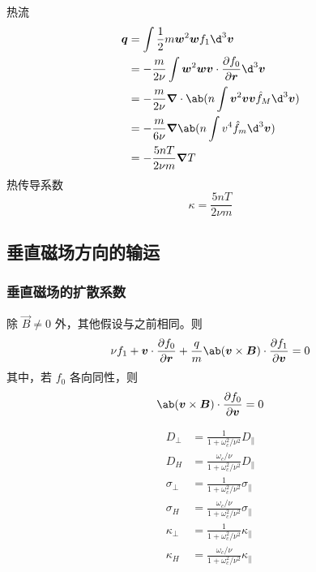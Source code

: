 热流
\begin{equation}\begin{aligned}
\vec{q} &= \int \frac{1}{2} m \vec{w}^2 \vec{w} f_1 \d^3\vec{v} \\
&= - \frac{m}{2 \nu} \int \vec{w}^2 \vec{w}
    \vec{v} \cdot \pdv{f_0}{\vec{r}} \d^3\vec{v} \\
&= - \frac{m}{2 \nu} \dive{\ab(n \int \vec{v}^2 \vec{v}
    \vec{v} \hat{f}_M \d^3\vec{v})} \\
&= - \frac{m}{6 \nu} \grad{\ab(n \int v^4 \hat{f}_m \d^3\vec{v})} \\
&= - \frac{5 n T}{2 \nu m} \grad{T}
\end{aligned}\end{equation}
热传导系数
\begin{equation}
\kappa = \frac{5 n T}{2 \nu m}
\end{equation}

\subsection{垂直磁场方向的输运}

\subsubsection{垂直磁场的扩散系数}

除 $\vec{B} \neq 0$ 外，其他假设与之前相同。则
\begin{equation}
\nu f_1 + \vec{v} \cdot \pdv{f_0}{\vec{r}}
+ \frac{q}{m} \ab(\vec{v} \times \vec{B}) \cdot \pdv{f_1}{\vec{v}}
= 0
\end{equation}
其中，若 $f_0$ 各向同性，则
\begin{equation}
\ab(\vec{v} \times \vec{B}) \cdot \pdv{f_0}{\vec{v}} = 0
\end{equation}

\begin{subequations}\begin{align}
D_\perp &= \frac{1}{1 + \omega_c^2 / \nu^2} D_\parallel \\
D_H &= \frac{\omega_c / \nu}{1 + \omega_c^2 / \nu^2} D_\parallel \\
\sigma_\perp &= \frac{1}{1 + \omega_c^2 / \nu^2} \sigma_\parallel \\
\sigma_H &= \frac{\omega_c / \nu}{1 + \omega_c^2 / \nu^2} \sigma_\parallel \\
\kappa_\perp &= \frac{1}{1 + \omega_c^2 / \nu^2} \kappa_\parallel \\
\kappa_H &= \frac{\omega_c / \nu}{1 + \omega_c^2 / \nu^2} \kappa_\parallel
\end{align}\end{subequations}
